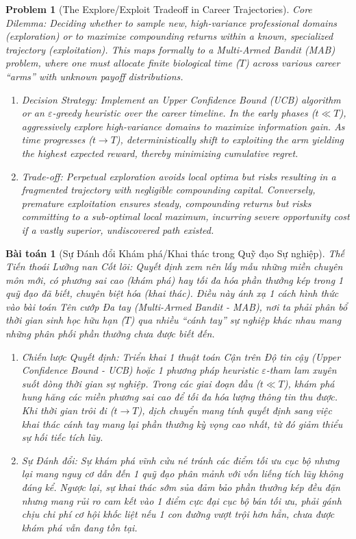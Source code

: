 \documentclass{article}
\newtheorem{problem}{Problem}
\newtheorem{baitoan}{Bài toán}
\begin{document}
\begin{problem}[The Explore/Exploit Tradeoff in Career Trajectories]
	\emph{Core Dilemma:} Deciding whether to sample new, high-variance professional domains (exploration) or to maximize compounding returns within a known, specialized trajectory (exploitation). This maps formally to a Multi-Armed Bandit (MAB) problem, where one must allocate finite biological time ($T$) across various career ``arms'' with unknown payoff distributions.
	\begin{enumerate}[label=(\roman*)]
		\item \emph{Decision Strategy:} Implement an Upper Confidence Bound (UCB) algorithm or an $\varepsilon$-greedy heuristic over the career timeline. In the early phases ($t \ll T$), aggressively explore high-variance domains to maximize information gain. As time progresses ($t \to T$), deterministically shift to exploiting the arm yielding the highest expected reward, thereby minimizing cumulative regret.
		\item \emph{Trade-off:} Perpetual exploration avoids local optima but risks resulting in a fragmented trajectory with negligible compounding capital. Conversely, premature exploitation ensures steady, compounding returns but risks committing to a sub-optimal local maximum, incurring severe opportunity cost if a vastly superior, undiscovered path existed.
	\end{enumerate}
\end{problem}
\begin{baitoan}[Sự Đánh đổi Khám phá/Khai thác trong Quỹ đạo Sự nghiệp]
	\emph{Thế Tiến thoái Lưỡng nan Cốt lõi:} Quyết định xem nên lấy mẫu những miền chuyên môn mới, có phương sai cao (khám phá) hay tối đa hóa phần thưởng kép trong 1 quỹ đạo đã biết, chuyên biệt hóa (khai thác). Điều này ánh xạ 1 cách hình thức vào bài toán Tên cướp Đa tay (Multi-Armed Bandit - MAB), nơi ta phải phân bổ thời gian sinh học hữu hạn ($T$) qua nhiều ``cánh tay'' sự nghiệp khác nhau mang những phân phối phần thưởng chưa được biết đến.
	\begin{enumerate}[label=(\roman*)]
		\item \emph{Chiến lược Quyết định:} Triển khai 1 thuật toán Cận trên Độ tin cậy (Upper Confidence Bound - UCB) hoặc 1 phương pháp heuristic $\varepsilon$-tham lam xuyên suốt dòng thời gian sự nghiệp. Trong các giai đoạn đầu ($t \ll T$), khám phá hung hăng các miền phương sai cao để tối đa hóa lượng thông tin thu được. Khi thời gian trôi đi ($t \to T$), dịch chuyển mang tính quyết định sang việc khai thác cánh tay mang lại phần thưởng kỳ vọng cao nhất, từ đó giảm thiểu sự hối tiếc tích lũy.
		\item \emph{Sự Đánh đổi:} Sự khám phá vĩnh cửu né tránh các điểm tối ưu cục bộ nhưng lại mang nguy cơ dẫn đến 1 quỹ đạo phân mảnh với vốn liếng tích lũy không đáng kể. Ngược lại, sự khai thác sớm sủa đảm bảo phần thưởng kép đều đặn nhưng mang rủi ro cam kết vào 1 điểm cực đại cục bộ bán tối ưu, phải gánh chịu chi phí cơ hội khốc liệt nếu 1 con đường vượt trội hơn hẳn, chưa được khám phá vẫn đang tồn tại.
	\end{enumerate}
\end{baitoan}
\end{document}
